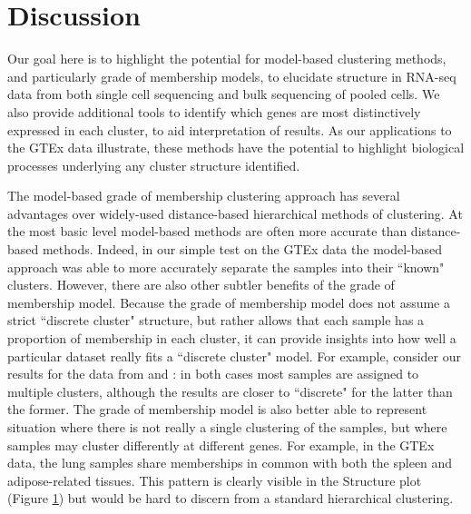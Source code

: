 \section{Discussion}

Our goal here is to highlight the potential for model-based clustering methods, and particularly grade of membership models, to elucidate
structure in RNA-seq data from both single cell sequencing and bulk sequencing of pooled cells. 
We also provide additional tools to identify which genes
are most distinctively expressed in each cluster, to aid interpretation of results.
As our applications to the GTEx data illustrate, these methods have the potential to highlight biological processes
underlying any cluster structure identified.

The model-based grade of membership clustering approach has several advantages over widely-used
distance-based hierarchical methods of clustering. At the most basic level model-based methods are often
more accurate than distance-based methods. Indeed, in our simple test on the GTEx data the model-based approach
was able to more accurately separate the samples into their ``known" clusters. However, there are also other subtler benefits of the grade
of membership model. Because the grade of membership model does not assume a strict ``discrete cluster" structure, but 
rather allows that each sample has a proportion of membership in each cluster, it can provide insights into how well a 
particular dataset really fits a ``discrete cluster" model. For example, consider our results for the data from \cite{Jaitin2014} and \cite{deng}:
in both cases most samples are assigned to multiple clusters, although the results are closer to ``discrete" for the latter than the former.
The grade of membership model is also better able to represent situation where there is not really a single clustering of the samples,
but where samples may cluster differently at different genes. For example, in the GTEx data, the lung samples share memberships in common with
both the spleen and adipose-related tissues. This pattern is clearly visible in the Structure plot (Figure \ref{}) but would be hard to 
discern from a standard hierarchical clustering. 

